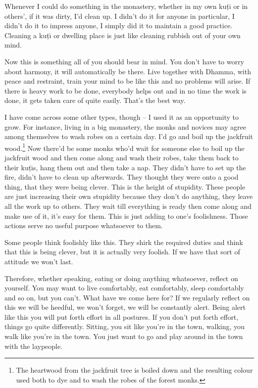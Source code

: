 Whenever I could do something in the monastery, whether in my own ku\d{t}\={\i} or in others', if it was dirty, I'd clean up. I didn't do it for anyone in particular, I didn't do it to impress anyone, I simply did it to maintain a good practice. Cleaning a ku\d{t}\={\i} or dwelling place is just like cleaning rubbish out of your own mind. 

Now this is something all of you should bear in mind. You don't have to worry about harmony, it will automatically be there. Live together with Dhamma, with peace and restraint, train your mind to be like this and no problems will arise. If there is heavy work to be done, everybody helps out and in no time the work is done, it gets taken care of quite easily. That's the best way. 

I have come across some other types, though -- I used it as an opportunity to grow.  For instance, living in a big monastery, the monks and novices may agree among themselves to wash robes on a certain day. I'd go and boil up the jackfruit wood.\footnote{The heartwood from the jackfruit tree is boiled down and the resulting colour used both to dye and to wash the robes of the forest monks.} Now there'd be some monks who'd wait for someone else to boil up the jackfruit wood and then come along and wash their robes, take them back to their ku\d{t}\={\i}s, hang them out and then take a nap. They didn't have to set up the fire, didn't have to clean up afterwards. They thought they were onto a good thing, that they were being clever. This is the height of stupidity. These people are just increasing their own stupidity because they don't do anything, they leave all the work up to others. They wait till everything is ready then come along and make use of it, it's easy for them. This is just adding to one's foolishness. Those actions serve no useful purpose whatsoever to them. 

Some people think foolishly like this. They shirk the required duties and think that this is being clever, but it is actually very foolish. If we have that sort of attitude we won't last. 

Therefore, whether speaking, eating or doing anything whatsoever, reflect on yourself. You may want to live comfortably, eat comfortably, sleep comfortably and so on, but you can't. What have we come here for? If we regularly reflect on this we will be heedful, we won't forget, we will be constantly alert. Being alert like this you will put forth effort in all postures. If you don't put forth effort, things go quite differently. Sitting, you sit like you're in the town, walking, you walk like you're in the town. You just want to go and play around in the town with the laypeople. 

